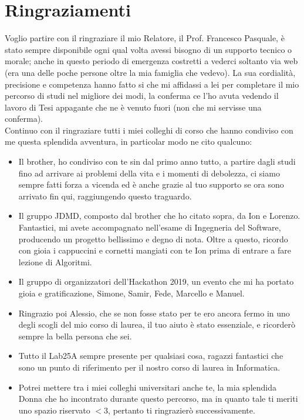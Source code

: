 \chapter*{Ringraziamenti}
Voglio partire con il ringraziare il mio Relatore, il Prof. Francesco Pasquale, \`e stato sempre disponibile ogni qual volta avessi bisogno di un supporto tecnico o morale; anche in questo periodo di emergenza costretti a vederci soltanto via web (era una delle poche persone oltre la mia famiglia che vedevo). La sua cordialit\`a, precisione e competenza hanno fatto si che mi affidassi a lei per completare il mio percorso di studi nel migliore dei modi, la conferma ce l'ho avuta vedendo il lavoro di Tesi appagante che ne \`e venuto fuori (non che mi servisse una conferma).\\
Continuo con il ringraziare tutti i miei colleghi di corso che hanno condiviso con me questa splendida avventura, in particolar modo ne cito qualcuno:\\

\begin{itemize}
    \item Il brother, ho condiviso con te sin dal primo anno tutto, a partire dagli studi fino ad arrivare ai problemi della vita e i momenti di debolezza, ci siamo sempre fatti forza a vicenda ed \`e anche grazie al tuo supporto se ora sono arrivato fin qui, raggiungendo questo traguardo.
    \item Il gruppo JDMD, composto dal brother che ho citato sopra, da Ion e Lorenzo. Fantastici, mi avete accompagnato nell'esame di Ingegneria del Software, producendo un progetto bellissimo e degno di nota. Oltre a questo, ricordo con gioia i cappuccini e cornetti mangiati con te Ion prima di entrare a fare lezione di Algoritmi.
    \item Il gruppo di organizzatori dell'Hackathon 2019, un evento che mi ha portato gioia e gratificazione, Simone, Samir, Fede, Marcello e Manuel.
    \item Ringrazio poi Alessio, che se non fosse stato per te ero ancora fermo in uno degli scogli del mio corso di laurea, il tuo aiuto \`e stato essenziale, e ricorder\`o sempre la bella persona che sei.
    \item Tutto il Lab25A sempre presente per qualsiasi cosa, ragazzi fantastici che sono un punto di riferimento per il nostro corso di laurea in Informatica.
    \item Potrei mettere tra i miei colleghi universitari anche te, la mia splendida Donna che ho incontrato durante questo percorso, ma in quanto tale ti meriti uno spazio riservato $<$3, pertanto ti ringrazier\`o successivamente.
\end{itemize}

